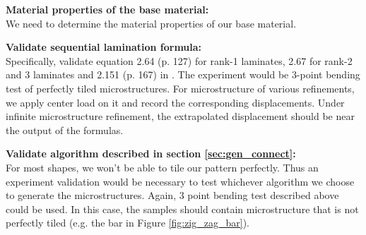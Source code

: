 \begin{description}
\item{\bf Material properties of the base material:}\\
We need to determine the material properties of our base material.

\item{\bf Validate sequential lamination formula:}\\
Specifically, validate equation 2.64 (p. 127) for rank-1 laminates, 2.67 for
rank-2 and 3 laminates and 2.151 (p. 167) in \cite{allaire2002shape}.  The
experiment would be 3-point bending test of perfectly tiled microstructures.
For microstructure of various refinements, we apply center load on it and record
the corresponding displacements.  Under infinite microstructure refinement, the
extrapolated displacement should be near the output of the formulas.

\item{\bf Validate algorithm described in section \ref{sec:gen_connect}:}\\
For most shapes, we won't be able to tile our pattern perfectly.  Thus an
experiment validation would be necessary to test whichever algorithm we choose to
generate the microstructures.  Again, 3 point bending test described above could
be used.  In this case, the samples should contain microstructure that is not
perfectly tiled (e.g. the bar in Figure \ref{fig:zig_zag_bar}).

\end{description}

